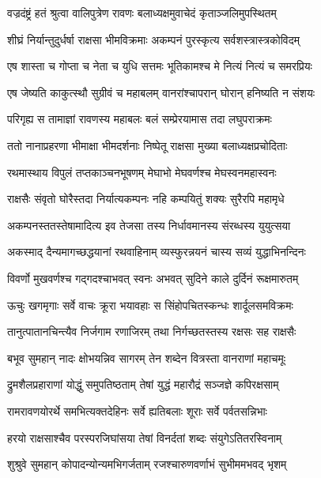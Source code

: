 
\twolineshloka
{वज्रदंष्ट्रं हतं श्रुत्वा वालिपुत्रेण रावणः}
{बलाध्यक्षमुवाचेदं कृताञ्जलिमुपस्थितम्} %

\twolineshloka
{शीघ्रं निर्यान्तुदुर्धर्षा राक्षसा भीमविक्रमाः}
{अकम्पनं पुरस्कृत्य सर्वशस्त्रास्त्रकोविदम्} %

\twolineshloka
{एष शास्ता च गोप्ता च नेता च युधि सत्तमः}
{भूतिकामश्च मे नित्यं नित्यं च समरप्रियः} %

\twolineshloka
{एष जेष्यति काकुत्स्थौ सुग्रीवं च महाबलम्}
{वानरांश्चापरान् घोरान् हनिष्यति न संशयः} %

\twolineshloka
{परिगृह्य स तामाज्ञां रावणस्य महाबलः}
{बलं सम्प्रेरयामास तदा लघुपराक्रमः} %

\twolineshloka
{ततो नानाप्रहरणा भीमाक्षा भीमदर्शनाः}
{निष्पेतू राक्षसा मुख्या बलाध्यक्षप्रचोदिताः} %

\twolineshloka
{रथमास्थाय विपुलं तप्तकाञ्चनभूषणम्}
{मेघाभो मेघवर्णश्च मेघस्वनमहास्वनः} %

\twolineshloka
{राक्षसैः संवृतो घोरैस्तदा निर्यात्यकम्पनः}
{नहि कम्पयितुं शक्यः सुरैरपि महामृधे} %

\twolineshloka
{अकम्पनस्ततस्तेषामादित्य इव तेजसा}
{तस्य निर्धावमानस्य संरब्धस्य युयुत्सया} %

\twolineshloka
{अकस्माद् दैन्यमागच्छद्धयानां रथवाहिनाम्}
{व्यस्फुरन्नयनं चास्य सव्यं युद्धाभिनन्दिनः} %

\twolineshloka
{विवर्णो मुखवर्णश्च गद्गदश्चाभवत् स्वनः}
{अभवत् सुदिने काले दुर्दिनं रूक्षमारुतम्} %

\twolineshloka
{ऊचुः खगमृगाः सर्वे वाचः क्रूरा भयावहाः}
{स सिंहोपचितस्कन्धः शार्दूलसमविक्रमः} %

\twolineshloka
{तानुत्पातानचिन्त्यैव निर्जगाम रणाजिरम्}
{तथा निर्गच्छतस्तस्य रक्षसः सह राक्षसैः} %

\twolineshloka
{बभूव सुमहान् नादः क्षोभयन्निव सागरम्}
{तेन शब्देन वित्रस्ता वानराणां महाचमूः} %

\twolineshloka
{द्रुमशैलप्रहाराणां योद्धुं समुपतिष्ठताम्}
{तेषां युद्धं महारौद्रं सञ्जज्ञे कपिरक्षसाम्} %

\twolineshloka
{रामरावणयोरर्थे समभित्यक्तदेहिनः}
{सर्वे ह्यतिबलाः शूराः सर्वे पर्वतसन्निभाः} %

\twolineshloka
{हरयो राक्षसाश्चैव परस्परजिघांसया}
{तेषां विनर्दतां शब्दः संयुगेऽतितरस्विनाम्} %

\twolineshloka
{शुश्रुवे सुमहान् कोपादन्योन्यमभिगर्जताम्}
{रजश्चारुणवर्णाभं सुभीममभवद् भृशम्} %

